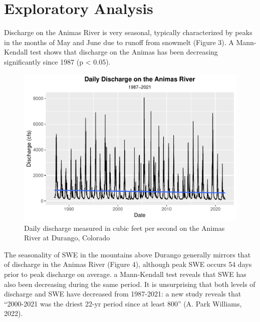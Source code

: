 \documentclass[
  12pt,
]{article}
\begin{document}
\hypertarget{exploratory-analysis}{%
\section{Exploratory Analysis}\label{exploratory-analysis}}

Discharge on the Animas River is very seasonal, typically characterized
by peaks in the months of May and June due to runoff from snowmelt
(Figure 3). A Mann-Kendall test shows that discharge on the Animas has
been decreasing significantly since 1987 (p \textless{} 0.05).

\begin{figure}
\centering
\includegraphics{Final_Report_files/figure-latex/unnamed-chunk-1-1.pdf}
\caption{Daily discharge measured in cubic feet per second on the Animas
River at Durango, Colorado}
\end{figure}

\newpage

The seasonality of SWE in the mountains above Durango generally mirrors
that of discharge in the Animas River (Figure 4), although peak SWE
occurs 54 days prior to peak discharge on average. a Mann-Kendall test
reveals that SWE has also been decreasing during the same period. It is
unsurprising that both levels of discharge and SWE have decreased from
1987-2021: a new study reveals that ``2000-2021 was the driest 22-yr
period since at least 800'' (A. Park Williams, 2022).
\end{document}
